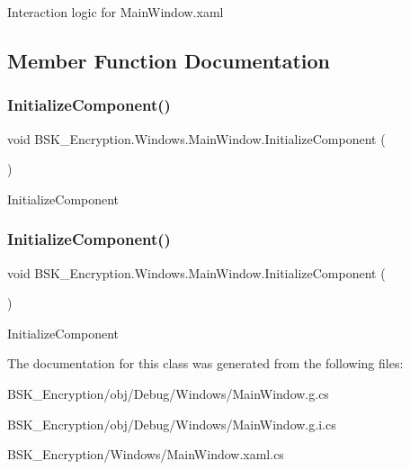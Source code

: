 Interaction logic for Main\+Window.\+xaml 

\subsection{Member Function Documentation}
\mbox{\label{class_b_s_k___encryption_1_1_windows_1_1_main_window_ad2eaef015028e1367f97c86e7c9878da}} 
\subsubsection{\texorpdfstring{Initialize\+Component()}{InitializeComponent()}\hspace{0.1cm}{\footnotesize\ttfamily [1/2]}}
{\footnotesize\ttfamily void B\+S\+K\+\_\+\+Encryption.\+Windows.\+Main\+Window.\+Initialize\+Component (\begin{DoxyParamCaption}{ }\end{DoxyParamCaption})}



Initialize\+Component 

\mbox{\label{class_b_s_k___encryption_1_1_windows_1_1_main_window_ad2eaef015028e1367f97c86e7c9878da}} 
\subsubsection{\texorpdfstring{Initialize\+Component()}{InitializeComponent()}\hspace{0.1cm}{\footnotesize\ttfamily [2/2]}}
{\footnotesize\ttfamily void B\+S\+K\+\_\+\+Encryption.\+Windows.\+Main\+Window.\+Initialize\+Component (\begin{DoxyParamCaption}{ }\end{DoxyParamCaption})}



Initialize\+Component 



The documentation for this class was generated from the following files\+:\begin{DoxyCompactItemize}
\item 
B\+S\+K\+\_\+\+Encryption/obj/\+Debug/\+Windows/Main\+Window.\+g.\+cs\item 
B\+S\+K\+\_\+\+Encryption/obj/\+Debug/\+Windows/Main\+Window.\+g.\+i.\+cs\item 
B\+S\+K\+\_\+\+Encryption/\+Windows/Main\+Window.\+xaml.\+cs\end{DoxyCompactItemize}
